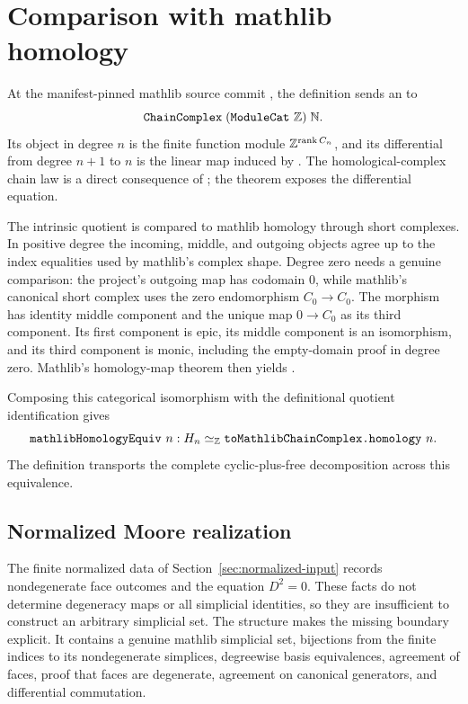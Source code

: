 \section{Comparison with mathlib homology}

At the manifest-pinned mathlib source commit
\citep{mathlib4320homology}, the definition  sends an
 to
\[
  \code{ChainComplex}\;(\code{ModuleCat}\ \Z)\;\mathbb{N}.
\]
Its object in degree $n$ is the finite function module
$\mathbb{Z}^{\operatorname{rank} C_n}$, and its differential from degree $n+1$ to $n$ is the
linear map induced by .  The homological-complex chain law
is a direct consequence of ; the theorem
 exposes the differential equation.

The intrinsic quotient is compared to mathlib homology through short
complexes.  In positive degree the incoming, middle, and outgoing objects
agree up to the index equalities used by mathlib's complex shape.  Degree
zero needs a genuine comparison: the project's outgoing map has codomain
$0$, while mathlib's canonical short complex uses the zero endomorphism
$C_0\to C_0$.  The morphism  has identity
middle component and the unique map $0\to C_0$ as its third component.
Its first component is epic, its middle component is an isomorphism, and its
third component is monic, including the empty-domain proof in degree zero.
Mathlib's homology-map theorem then yields .

Composing this categorical isomorphism with the definitional quotient
identification gives
\[
  \texttt{mathlibHomologyEquiv}\ n :
  H_n \simeq_{\mathbb{Z}}
  \texttt{toMathlibChainComplex.homology}\ n.
\]
The definition  transports the complete
cyclic-plus-free decomposition across this equivalence.

\subsection{Normalized Moore realization}

The finite normalized data of Section~\ref{sec:normalized-input} records
nondegenerate face outcomes and the equation $D^2=0$.  These facts do not
determine degeneracy maps or all simplicial identities, so they are
insufficient to construct an arbitrary simplicial set.  The structure
 makes the missing boundary explicit.  It
contains a genuine mathlib simplicial set, bijections from the finite indices
to its nondegenerate simplices, degreewise basis equivalences, agreement of
 faces, proof that  faces are degenerate, agreement on
canonical generators, and differential commutation.

